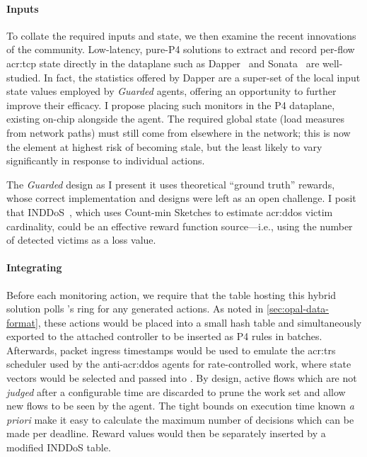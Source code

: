 
\paragraph{Inputs}
To collate the required inputs and state, we then examine the recent innovations of the community.
Low-latency, pure-P4 solutions to extract and record per-flow \gls{acr:tcp} state directly in the dataplane such as Dapper~\parencite{DBLP:conf/sosr/GhasemiBR17} and Sonata~\parencite{DBLP:conf/sigcomm/GuptaHCFRW18} are well-studied.
In fact, the statistics offered by Dapper are a super-set of the local input state values employed by \emph{Guarded} agents, offering an opportunity to further improve their efficacy. 
I propose placing such monitors in the P4 dataplane, existing on-chip alongside the \approachshort{} agent.
The required global state (load measures from network paths) must still come from elsewhere in the network; this is now the element at highest risk of becoming stale, but the least likely to vary significantly in response to individual actions.

The \emph{Guarded} design as I present it uses theoretical ``ground truth'' rewards, whose correct implementation and designs were left as an open challenge. 
I posit that INDDoS~\parencite{DBLP:journals/tnsm/DingSPCS21}, which uses Count-min Sketches to estimate \gls{acr:ddos} victim cardinality, could be an effective reward function source---i.e., using the number of detected victims as a loss value.

\paragraph{Integrating \approachshort}
Before each monitoring action, we require that the table hosting this hybrid solution polls \approachshort{}'s \outring{} ring for any generated actions.
As noted in \cref{sec:opal-data-format}, these actions would be placed into a small hash table and simultaneously exported to the attached controller to be inserted as P4 rules in batches.
Afterwards, packet ingress timestamps would be used to emulate the \gls{acr:trs} scheduler used by the anti-\gls{acr:ddos} agents for rate-controlled work, where state vectors would be selected and passed into \approachshort.
By design, active flows which are not \emph{judged} after a configurable time are discarded to prune the work set and allow new flows to be seen by the agent.
The tight bounds on execution time known \emph{a priori} make it easy to calculate the maximum number of decisions which can be made per deadline.
Reward values would then be separately inserted by a modified INDDoS table.

